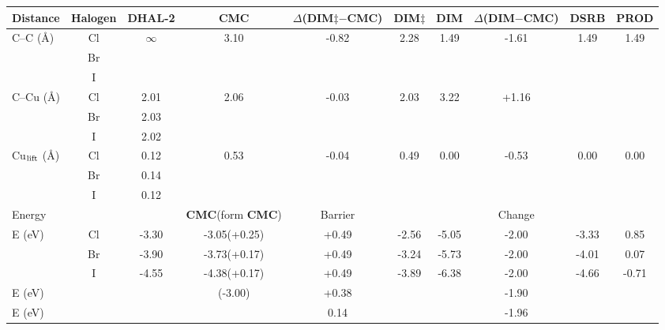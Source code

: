 \documentclass[%
 reprint,
 amsmath,amssymb,
 aps,
prb,
floatfix,
]{revtex4-2}
\begin{document}
\begin{table}
\centering
\begin{tabular}{ lccccccccc  }
 \hline
 \hline
 Distance & Halogen & \textbf{DHAL-2} & \textbf{CMC} & $\Delta$(\textbf{DIM$\ddagger$}$-$\textbf{CMC}) & \textbf{DIM$\ddagger$} & \textbf{DIM} & $\Delta$(\textbf{DIM}$-$\textbf{CMC}) & \textbf{DSRB} & \textbf{PROD}\\ 
 \hline 
 \multirow{3}{*}{C--C (\si{\angstrom})} & Cl & \multirow{3}{*}{$\infty$} & \multirow{3}{*}{3.10} & \multirow{3}{*}{-0.82} & \multirow{3}{*}{2.28} & \multirow{3}{*}{1.49} & \multirow{3}{*}{-1.61} & \multirow{3}{*}{1.49} &\multirow{3}{*}{1.49}\\ 
 & Br & &  &  &  & & & &\\ 
 & I & &  &  &  & & & &\\ 
 \hline
 \multirow{3}{*}{C--Cu (\si{\angstrom}) } & Cl & 2.01 & \multirow{3}{*}{2.06} & \multirow{3}{*}{-0.03} & \multirow{3}{*}{2.03} & \multirow{3}{*}{3.22} & \multirow{3}{*}{+1.16} & \multirow{3}{*}{} &\multirow{3}{*}{}\\ 
 & Br & 2.03 &  &  &  & & & &\\ 
 & I &2.02 &  &  &  & & & &\\ 
 \hline
 \multirow{3}{*}{Cu$_{\rm lift}$ (\si{\angstrom}) } & Cl & 0.12 & \multirow{3}{*}{0.53} & \multirow{3}{*}{-0.04} & \multirow{3}{*}{0.49} & \multirow{3}{*}{0.00} & \multirow{3}{*}{-0.53} & \multirow{3}{*}{0.00} &\multirow{3}{*}{0.00}\\ 
 & Br & 0.14 &  &  &  & & & &\\ 
 & I &0.12 &  &  &  & & & &\\ 
 \hline
 \hline
 Energy & & & \textbf{CMC}(form \textbf{CMC}) & Barrier & & & Change & &\\
 \hline
 \multirow{3}{*}{E (\si{\electronvolt}) } & Cl & -3.30 & -3.05(+0.25) &+0.49 &-2.56 & -5.05 & -2.00& -3.33&0.85\\ 
 & Br &-3.90 & -3.73(+0.17) &+0.49 & -3.24& -5.73 & -2.00& -4.01&0.07\\ 
 & I  & -4.55 & -4.38(+0.17) & +0.49& -3.89& -6.38 & -2.00& -4.66&-0.71\\ 
 \hline
 E (\si{\electronvolt})~\cite{pccp2010} & & & (-3.00) & +0.38 & & & -1.90 & & \\
 \hline
 E (\si{\electronvolt})~\cite{jacs2013} & & & & 0.14 & & & -1.96 & &\\

\end{tabular}
\end{table}
\end{document}
